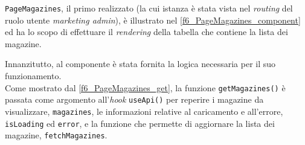 \texttt{PageMagazines}, il primo realizzato (la cui istanza è stata vista nel \textit{routing} del ruolo utente \textit{marketing admin}), è illustrato nel \autoref{f6_PageMagazines_component} ed ha lo scopo di effettuare il \textit{rendering} della tabella che contiene la lista dei magazine.


Innanzitutto, al componente è stata fornita la logica necessaria per il suo funzionamento.\\
Come mostrato dal \autoref{f6_PageMagazines_get}, la funzione \texttt{getMagazines()} è passata come argomento all'\textit{hook} \texttt{useApi()} per reperire i magazine da visualizzare, \texttt{magazines}, le informazioni relative al caricamento e all'errore, \texttt{isLoading} ed \texttt{error}, e la funzione che permette di aggiornare la lista dei magazine, \texttt{fetchMagazines}.

